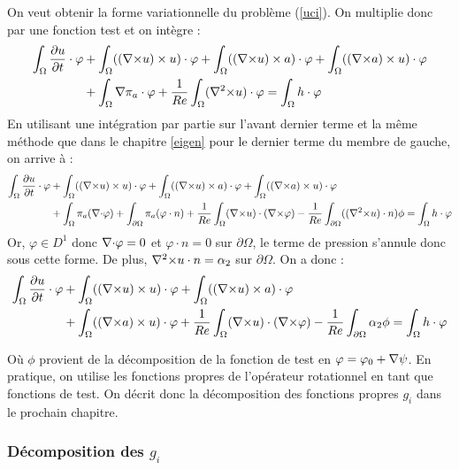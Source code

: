 On veut obtenir la forme variationnelle du problème (\ref{uci}). On multiplie donc par une fonction test et on intègre :
\begin{align*}
\int_\Omega \frac{\partial u}{\partial t}\cdot \varphi &+ \int_\Omega (({\nabla\times} u)\times u)\cdot \varphi + \int_\Omega (({\nabla\times} u)\times a)\cdot\varphi + \int_\Omega (({\nabla\times} a)\times u)\cdot\varphi \\
&+ \int_\Omega {\nabla}\pi_a\cdot\varphi + \frac{1}{Re}\int_\Omega ({\nabla^2\times} u)\cdot\varphi = \int_\Omega h\cdot\varphi
\end{align*}
En utilisant une intégration par partie sur l'avant dernier terme et la même méthode que dans le chapitre \ref{eigen} pour le dernier terme du membre de gauche, on arrive à :
\begin{align*}
\int_\Omega \frac{\partial u}{\partial t}\cdot \varphi &+ \int_\Omega (({\nabla\times} u)\times u)\cdot \varphi + \int_\Omega (({\nabla\times} u)\times a)\cdot\varphi + \int_\Omega (({\nabla\times} a)\times u)\cdot\varphi\\ 
&+ \int_\Omega \pi_a({\nabla\cdot}\varphi) + \int_{\partial \Omega} \pi_a(\varphi\cdot n) + \frac{1}{Re}\int_\Omega ({\nabla\times} u)\cdot({\nabla\times}\varphi) -\frac{1}{Re}\int_{\partial\Omega} (({\nabla^2\times} u)\cdot n)\phi = \int_\Omega h\cdot\varphi
\end{align*}
Or, $\varphi\in D^1$ donc ${\nabla\cdot}\varphi=0$ et $\varphi\cdot n=0$ sur $\partial\Omega$, le terme de pression s'annule donc sous cette forme. De plus, ${\nabla^2\times} u\cdot n=\alpha_2$ sur $\partial\Omega$. On a donc :
\begin{eqnarray}
\label{fvu}
\begin{aligned}
\int_\Omega \frac{\partial u}{\partial t}\cdot \varphi &+ \int_\Omega (({\nabla\times} u)\times u)\cdot \varphi + \int_\Omega (({\nabla\times} u)\times a)\cdot\varphi \\
&+ \int_\Omega (({\nabla\times} a)\times u)\cdot\varphi + \frac{1}{Re}\int_\Omega ({\nabla\times} u)\cdot({\nabla\times}\varphi) -\frac{1}{Re}\int_{\partial\Omega} \alpha_2\phi = \int_\Omega h\cdot\varphi
\end{aligned}
\end{eqnarray}

Où $\phi$ provient de la décomposition de la fonction de test en $\varphi=\varphi_0+{\nabla}\psi$. En pratique, on utilise les fonctions propres de l'opérateur rotationnel en tant que fonctions de test.
On décrit donc la décomposition des fonctions propres $g_i$ dans le prochain chapitre.

\subsubsection{Décomposition des $g_i$}
\label{decomp}


